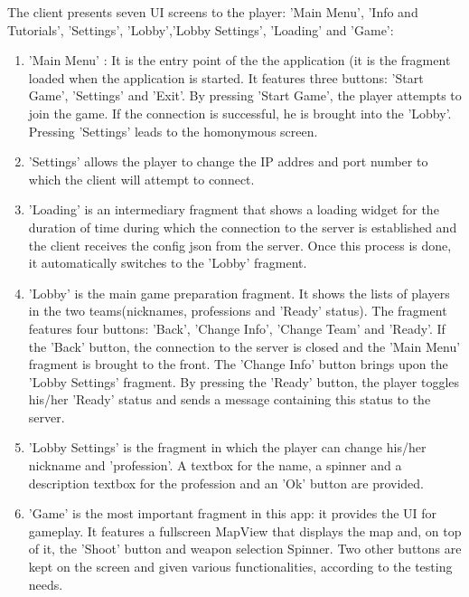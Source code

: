 The client presents seven UI screens to the player: 'Main Menu', 'Info and
Tutorials', 'Settings', 'Lobby','Lobby Settings', 'Loading' and 'Game':

\begin{enumerate}
  \item 'Main Menu' : It is the entry point of the the application (it is the
  fragment loaded when the application is started. It features three buttons:
  'Start Game', 'Settings' and 'Exit'. By pressing 'Start Game', the player
  attempts to join the game. If the connection is successful, he is brought into
  the 'Lobby'. Pressing 'Settings' leads to the homonymous screen.
  
  \item 'Settings' allows the player to change the IP addres and port
  number to which the client will attempt to connect.
  
  \item 'Loading' is an intermediary fragment that shows a loading widget for
  the duration of time during which the connection to the server is established
  and the client receives the config json from the server. Once this process is
  done, it automatically switches to the 'Lobby' fragment.
  
  \item 'Lobby' is the main game preparation fragment. It shows the lists of
  players in the two teams(nicknames, professions and 'Ready' status). The
  fragment features four buttons: 'Back', 'Change Info', 'Change Team' and
  'Ready'. If the 'Back' button, the connection to the server is closed and the
  'Main Menu' fragment is brought to the front. The 'Change Info' button brings
  upon the 'Lobby Settings' fragment. By pressing the 'Ready' button, the player
  toggles his/her 'Ready' status and sends a message containing this status to
  the server.
  
  \item 'Lobby Settings' is the fragment in which the player can change his/her
  nickname and 'profession'. A textbox for the name, a spinner and a
  description textbox for the profession and an 'Ok' button are provided. 
  
  \item 'Game' is the most important fragment in this app: it provides the UI
  for gameplay. It features a fullscreen MapView that displays the map and, on
  top of it, the 'Shoot' button and weapon selection Spinner. Two other buttons
  are kept on the screen and given various functionalities, according to the
  testing needs.
   
\end{enumerate}

